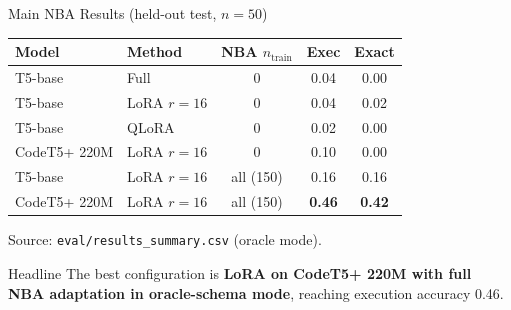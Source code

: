 \documentclass[aspectratio=169,11pt]{beamer}
\begin{document}
\begin{frame}{Main NBA Results (held-out test, $n{=}50$)}
  \centering\footnotesize
  \begin{tabular}{llccc}
    \toprule
    \textbf{Model} & \textbf{Method} & \textbf{NBA $n_{\text{train}}$} & \textbf{Exec} & \textbf{Exact} \\
    \midrule
    T5-base       & Full       & 0     & 0.04 & 0.00 \\
    T5-base       & LoRA $r{=}16$ & 0     & 0.04 & 0.02 \\
    T5-base       & QLoRA      & 0     & 0.02 & 0.00 \\
    CodeT5+ 220M  & LoRA $r{=}16$ & 0     & 0.10 & 0.00 \\
    \midrule
    T5-base       & LoRA $r{=}16$ & all (150) & 0.16 & 0.16 \\
    \alert{CodeT5+ 220M} & \alert{LoRA $r{=}16$} & \alert{all (150)} & \alert{\textbf{0.46}} & \alert{\textbf{0.42}} \\
    \bottomrule
  \end{tabular}

  \vspace{6pt}
  Source: \texttt{eval/results\_summary.csv} (oracle mode).

  \begin{alertblock}{Headline}
    The best configuration is \textbf{LoRA on CodeT5+ 220M with full NBA
    adaptation in oracle-schema mode}, reaching execution accuracy 0.46.
  \end{alertblock}
\end{frame}
\end{document}
